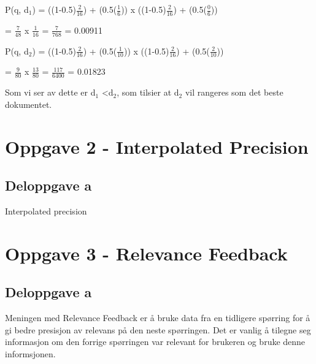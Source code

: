 \documentclass[]{article}
\begin{document}
\vspace{2mm}

P(q, d$_{1}$) = ((1-0.5)$\frac{2}{16}$) + (0.5($\frac{1}{6}$))  x  ((1-0.5)$\frac{2}{16}$) + (0.5($\frac{0}{6}$))

\vspace{2mm}

\hspace{8.4ex} = $\frac{7}{48}$  x  $\frac{1}{16}$   =   $\frac{7}{768}$  =  0.00911  

\vspace{4mm}

P(q, d$_{2}$) = ((1-0.5)$\frac{2}{16}$) + (0.5($\frac{1}{10}$))  x  ((1-0.5)$\frac{2}{16}$) + (0.5($\frac{2}{10}$))

\vspace{2mm}

\hspace{8.4ex} = $\frac{9}{80}$  x  $\frac{13}{80}$   =   $\frac{117}{6400}$  =  0.01823  

\vspace{2mm} 

\noindent Som vi ser av dette er d$_{1}$ \textless  d$_{2}$, som tilsier at d$_{2}$ vil rangeres som det beste dokumentet. 

\pagebreak

\section*{Oppgave 2 - Interpolated Precision}
\subsection*{Deloppgave a}
Interpolated precision


\pagebreak
\section*{Oppgave 3 - Relevance Feedback}
\subsection*{Deloppgave a}
Meningen med Relevance Feedback er å bruke data fra en tidligere spørring for å gi bedre presisjon av relevans på den neste spørringen. Det er vanlig å tilegne seg informasjon om den forrige spørringen var relevant for brukeren og bruke denne informsjonen. 
\end{document}
